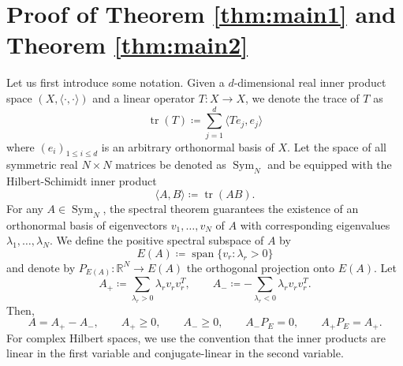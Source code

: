 \documentclass[reqno,a4paper,12pt]{amsart}
\numberwithin{equation}{section}
\newcommand\1{\mathds{1}}
\DeclareMathOperator{\tr}{tr}
\DeclareMathOperator{\sym}{Sym}
\DeclareMathOperator{\lspan}{span}
\begin{document}
\section{Proof of Theorem \ref{thm:main1} and Theorem \ref{thm:main2}}\label{sec:proofs}
Let us first introduce some notation. Given  a $d$-dimensional real inner product space $(X, \langle\cdot, \cdot\rangle)$ and a linear operator $T:X\to X$, we denote the trace of $T$ as  
\begin{equation*}
   \tr(T)\coloneqq\sum_{j=1}^d \langle Te_j,e_j\rangle 
\end{equation*}
where $(e_i)_{1\leq i\leq d}$ is an arbitrary orthonormal basis of $X$. Let the space of all symmetric real $N\times N$ matrices be denoted as $\sym_N$ and be equipped with the Hilbert-Schimidt inner product
\begin{equation*}
    \langle A, B\rangle \coloneqq \tr(AB).
\end{equation*}
For any $A\in \sym_N$, the spectral theorem guarantees the existence of an orthonormal basis of eigenvectors $v_1,\ldots,v_N$ of $A$ with corresponding eigenvalues $\lambda_1,\ldots,\lambda_N$. We define the positive spectral subspace of $A$ by
\begin{equation*}
    E(A)\coloneqq\lspan\{v_r:\lambda_r>0\}
\end{equation*}
and denote by $P_{E(A)}:\mathbb R^N\to E(A)$ the orthogonal projection onto $E(A)$. Let
\begin{equation*}
    A_+\coloneqq\sum_{\lambda_r>0}\lambda_r v_rv_r^T,
    \qquad
    A_-\coloneqq-\sum_{\lambda_r<0}\lambda_r v_rv_r^T.    
\end{equation*}
Then,
\begin{equation*}
    A=A_+-A_-,
    \qquad
    A_+\ge 0,
    \qquad
    A_-\ge 0,
    \qquad
    A_-P_E=0,
    \qquad
    A_+P_E=A_+.
\end{equation*}
For complex Hilbert spaces, we use the convention that the inner products are linear in the first variable and conjugate-linear in the second variable.
\end{document}
